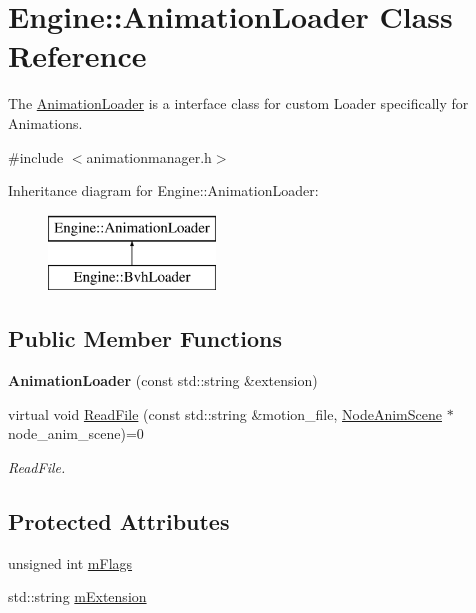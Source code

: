 \hypertarget{classEngine_1_1AnimationLoader}{}\section{Engine\+:\+:Animation\+Loader Class Reference}
\label{classEngine_1_1AnimationLoader}


The \hyperlink{classEngine_1_1AnimationLoader}{Animation\+Loader} is a interface class for custom Loader specifically for Animations.  




{\ttfamily \#include $<$animationmanager.\+h$>$}

Inheritance diagram for Engine\+:\+:Animation\+Loader\+:\begin{figure}[H]
\begin{center}
\leavevmode
\includegraphics[height=2.000000cm]{classEngine_1_1AnimationLoader}
\end{center}
\end{figure}
\subsection*{Public Member Functions}
\begin{DoxyCompactItemize}
\item 
\hypertarget{classEngine_1_1AnimationLoader_a063c535a3cecc06caaae1833325bde07}{}{\bfseries Animation\+Loader} (const std\+::string \&extension)\label{classEngine_1_1AnimationLoader_a063c535a3cecc06caaae1833325bde07}

\item 
virtual void \hyperlink{classEngine_1_1AnimationLoader_ac077ab98aa64ab4eae5e7ca47d7d48f1}{Read\+File} (const std\+::string \&motion\+\_\+file, \hyperlink{classEngine_1_1NodeAnimScene}{Node\+Anim\+Scene} $\ast$node\+\_\+anim\+\_\+scene)=0
\begin{DoxyCompactList}\small\item\em Read\+File. \end{DoxyCompactList}\end{DoxyCompactItemize}
\subsection*{Protected Attributes}
\begin{DoxyCompactItemize}
\item 
unsigned int \hyperlink{classEngine_1_1AnimationLoader_ae6851f3980f517aa5eb62b9bb9f16ed0}{m\+Flags}
\item 
std\+::string \hyperlink{classEngine_1_1AnimationLoader_a0507d3a76b6f33f05be9fc789138c508}{m\+Extension}
\end{DoxyCompactItemize}
